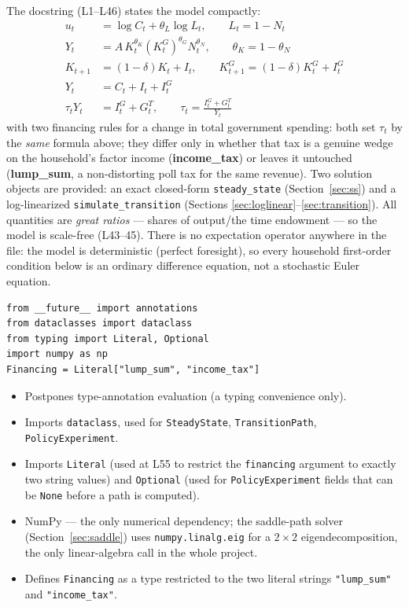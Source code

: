 \documentclass[11pt]{article}
\begin{document}
The docstring (L1--L46) states the model compactly:
\begin{align}
u_t &= \log C_t + \theta_L\log L_t, \qquad L_t = 1-N_t \tag{preferences}\\
Y_t &= A\,K_t^{\theta_K}(K^G_t)^{\theta_G}N_t^{\theta_N}, \qquad \theta_K=1-\theta_N \tag{technology}\\
K_{t+1} &= (1-\delta)K_t+I_t, \qquad K^G_{t+1}=(1-\delta)K^G_t+I^G_t \tag{capital accum.}\\
Y_t &= C_t+I_t+I^G_t \tag{resource constraint}\\
\tau_t Y_t &= I^G_t+G^T_t, \qquad \tau_t=\frac{I^G_t+G^T_t}{Y_t} \tag{government budget}
\end{align}
with two financing rules for a change in total government spending: both set
$\tau_t$ by the \emph{same} formula above; they differ only in whether that
tax is a genuine wedge on the household's factor income
(\textbf{income\_tax})
or leaves it untouched (\textbf{lump\_sum}, a non-distorting poll tax for
the same revenue). Two solution objects are provided: an exact closed-form
\texttt{steady\_state} (Section~\ref{sec:ss}) and a log-linearized
\texttt{simulate\_transition} (Sections \ref{sec:loglinear}--\ref{sec:transition}).
All quantities are \emph{great ratios} --- shares of output/the time
endowment --- so the model is scale-free (L43--45). There is no expectation
operator anywhere in the file: the model is deterministic (perfect
foresight), so every household first-order condition below is an ordinary
difference equation, not a stochastic Euler equation.

\begin{lstlisting}[firstnumber=48]
from __future__ import annotations
from dataclasses import dataclass
from typing import Literal, Optional
import numpy as np
Financing = Literal["lump_sum", "income_tax"]
\end{lstlisting}
\begin{itemize}
\item[\textbf{L48}] Postpones type-annotation evaluation (a typing
convenience only).
\item[\textbf{L50}] Imports \texttt{dataclass}, used for \texttt{SteadyState},
\texttt{TransitionPath}, \texttt{PolicyExperiment}.
\item[\textbf{L51}] Imports \texttt{Literal} (used at L55 to restrict the
\texttt{financing} argument to exactly two string values) and
\texttt{Optional} (used for \texttt{PolicyExperiment} fields that can be
\texttt{None} before a path is computed).
\item[\textbf{L53}] NumPy --- the only numerical dependency; the saddle-path
solver (Section~\ref{sec:saddle}) uses \texttt{numpy.linalg.eig} for a
$2\times2$ eigendecomposition, the only linear-algebra call in the whole
project.
\item[\textbf{L55}] Defines \texttt{Financing} as a type restricted to the
two literal strings \texttt{"lump\_sum"} and \texttt{"income\_tax"}.
\end{itemize}
\end{document}
